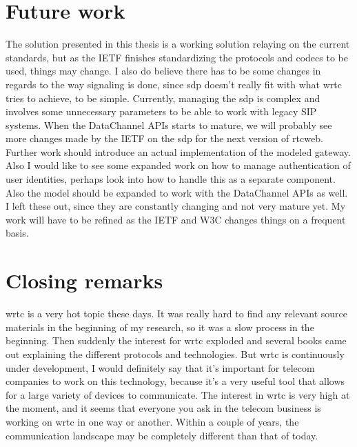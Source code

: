 \section{Future work}
The solution presented in this thesis is a working solution relaying on the current standards, but as the IETF finishes standardizing the protocols and codecs to be used, things may change. I also do believe there has to be some changes in regards to the way signaling is done, since \gls{sdp} doesn't really fit with what \gls{wrtc} tries to achieve, to be simple. Currently, managing the \gls{sdp} is complex and involves some unnecessary parameters to be able to work with legacy SIP systems. When the DataChannel APIs starts to mature, we will probably see more changes made by the IETF on the \gls{sdp} for the next version of \gls{rtcweb}. Further work should introduce an actual implementation of the modeled gateway. Also I would like to see some expanded work on how to manage authentication of user identities, perhaps look into how to handle this as a separate component. Also the model should be expanded to work with the DataChannel APIs as well. I left these out, since they are constantly changing and not very mature yet. My work will have to be refined as the IETF and W3C changes things on a frequent basis.

\section{Closing remarks}
\gls{wrtc} is a very hot topic these days. It was really hard to find any relevant source materials in the beginning of my research, so it was a slow process in the beginning. Then suddenly the interest for \gls{wrtc} exploded and several books came out explaining the different protocols and technologies. But \gls{wrtc} is continuously under development, I would definitely say that it's important for telecom companies to work on this technology, because it's a very useful tool that allows for a large variety of devices to communicate. The interest in \gls{wrtc} is very high at the moment, and it seems that everyone you ask in the telecom business is working on \gls{wrtc} in one way or another. Within a couple of years, the communication landscape may be completely different than that of today.